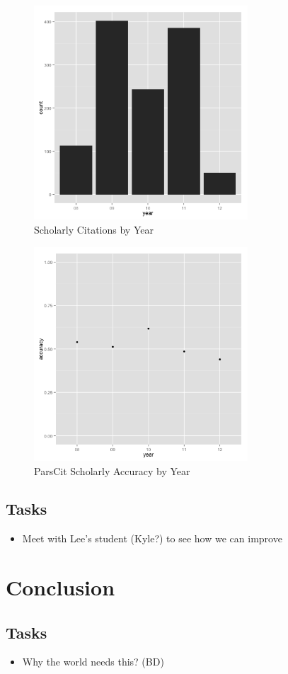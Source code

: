 \documentclass[12pt]{article}
\begin{document}
\begin{figure}
\begin{center}
\includegraphics[height=8cm]{scholarly_totals.png}
\caption{Scholarly Citations by Year}
\label{fig:scholarlytotals}
\end{center}
\end{figure}

\begin{figure}
\begin{center}
\includegraphics[height=8cm]{scholarly_accuracy.png}
\caption{ParsCit Scholarly Accuracy by Year}
\label{fig:scholarlyaccuracy}
\end{center}
\end{figure}

\subsection{Tasks}

\begin{itemize}
\item Meet with Lee's student (Kyle?) to see how we can improve
\end{itemize}


\section{Conclusion}

\subsection{Tasks}

\begin{itemize}
\item Why the world needs this? (BD)
\end{itemize}


\clearpage
\singlespace

\nocite{*}

\clearpage
\end{document}

